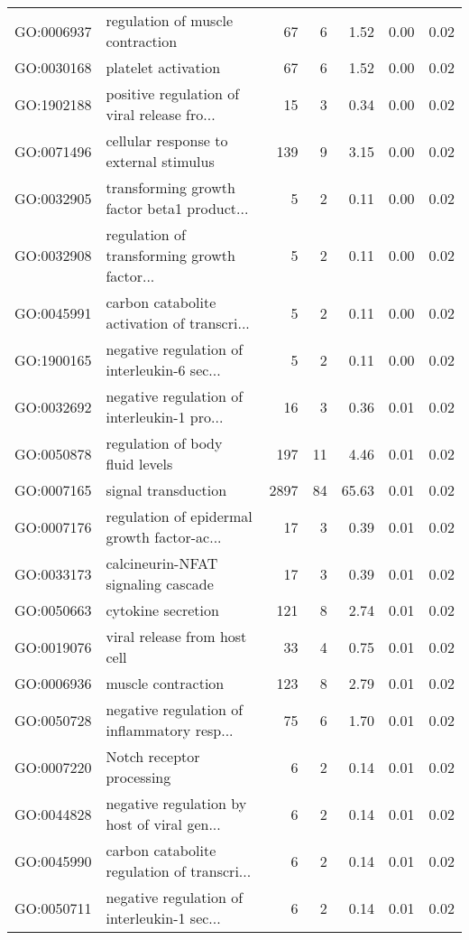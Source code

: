 \begin{table}[ht]
\begin{tabular}{llrrrrr}
  GO:0006937 & regulation of muscle contraction &  67 &   6 & 1.52 & 0.00 & 0.02 \\ 
  GO:0030168 & platelet activation &  67 &   6 & 1.52 & 0.00 & 0.02 \\ 
  GO:1902188 & positive regulation of viral release fro... &  15 &   3 & 0.34 & 0.00 & 0.02 \\ 
  GO:0071496 & cellular response to external stimulus & 139 &   9 & 3.15 & 0.00 & 0.02 \\ 
  GO:0032905 & transforming growth factor beta1 product... &   5 &   2 & 0.11 & 0.00 & 0.02 \\ 
  GO:0032908 & regulation of transforming growth factor... &   5 &   2 & 0.11 & 0.00 & 0.02 \\ 
  GO:0045991 & carbon catabolite activation of transcri... &   5 &   2 & 0.11 & 0.00 & 0.02 \\ 
  GO:1900165 & negative regulation of interleukin-6 sec... &   5 &   2 & 0.11 & 0.00 & 0.02 \\ 
  GO:0032692 & negative regulation of interleukin-1 pro... &  16 &   3 & 0.36 & 0.01 & 0.02 \\ 
  GO:0050878 & regulation of body fluid levels & 197 &  11 & 4.46 & 0.01 & 0.02 \\ 
  GO:0007165 & signal transduction & 2897 &  84 & 65.63 & 0.01 & 0.02 \\ 
  GO:0007176 & regulation of epidermal growth factor-ac... &  17 &   3 & 0.39 & 0.01 & 0.02 \\ 
  GO:0033173 & calcineurin-NFAT signaling cascade &  17 &   3 & 0.39 & 0.01 & 0.02 \\ 
  GO:0050663 & cytokine secretion & 121 &   8 & 2.74 & 0.01 & 0.02 \\ 
  GO:0019076 & viral release from host cell &  33 &   4 & 0.75 & 0.01 & 0.02 \\ 
  GO:0006936 & muscle contraction & 123 &   8 & 2.79 & 0.01 & 0.02 \\ 
  GO:0050728 & negative regulation of inflammatory resp... &  75 &   6 & 1.70 & 0.01 & 0.02 \\ 
  GO:0007220 & Notch receptor processing &   6 &   2 & 0.14 & 0.01 & 0.02 \\ 
  GO:0044828 & negative regulation by host of viral gen... &   6 &   2 & 0.14 & 0.01 & 0.02 \\ 
  GO:0045990 & carbon catabolite regulation of transcri... &   6 &   2 & 0.14 & 0.01 & 0.02 \\ 
  GO:0050711 & negative regulation of interleukin-1 sec... &   6 &   2 & 0.14 & 0.01 & 0.02 \\ 

\end{tabular}
\end{table}
